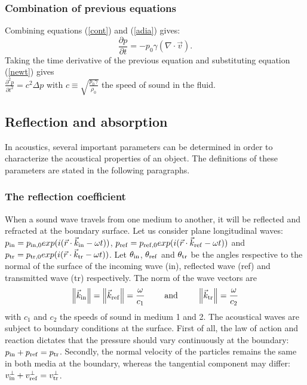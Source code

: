 \subsubsection*{Combination of previous equations}
Combining equations (\ref{cont}) and (\ref{adia}) gives:
\begin{equation}
\frac{\partial p}{\partial t} = - p_0 \gamma \left(\nabla \cdot \vec{v}\right).
\label{dpdt}
\end{equation}
Taking the time derivative of the previous equation and substituting equation (\ref{newt}) gives\\
$\frac{\partial^2 p}{\partial t^2} =  c^2 \Delta p$ with $c\equiv \sqrt{\frac{p_0 \gamma}{\rho_0}}$ the speed of sound in the fluid.







\subsection{Reflection and absorption}
In acoustics, several important parameters can be determined in order to characterize the acoustical properties of an object. The  definitions of these parameters are stated in the following paragraphs.


\subsubsection*{The reflection coefficient}
When a sound wave travels from one medium to another, it will be reflected and refracted at the boundary surface. Let us consider plane longitudinal waves:
$p_\mathrm{in} = p_\mathrm{in, 0} exp(i (\vec{r} \cdot \vec{k}_\mathrm{in} -  \omega t))$, $p_\mathrm{ref} = p_\mathrm{ref, 0} exp(i (\vec{r} \cdot \vec{k}_\mathrm{ref} -  \omega t))$ and $p_\mathrm{tr} = p_\mathrm{tr, 0} exp(i (\vec{r} \cdot \vec{k}_\mathrm{tr} -  \omega t))$. Let $\theta_\mathrm{in}$, $\theta_\mathrm{ref}$ and $\theta_\mathrm{tr}$ be the angles respective to the normal of the surface of the incoming wave (in), reflected  wave (ref) and transmitted  wave (tr) respectively. The norm of the wave vectors are 
\[
\left\|\vec{k}_\mathrm{in}\right\|
= \left\|\vec{k}_\mathrm{ref}\right\|
= \frac{\omega}{c_1}
\qquad\textrm{ and } \qquad
\left\|\vec{k}_\mathrm{tr}\right\|
= \frac{\omega}{c_2}
\]
with $c_1$ and $c_2$ the speeds of sound in medium 1 and 2. The acoustical waves are subject to boundary conditions at the surface. First of all, the law of action and reaction dictates that the pressure should vary continuously at the boundary: $p_\mathrm{in} + p_\mathrm{ref} = p_\mathrm{tr}$.
Secondly, the normal velocity of the particles remains the same in both media at the boundary, whereas the tangential component may differ: $v_\mathrm{in}^\perp + v_\mathrm{ref}^\perp = v_\mathrm{tr}^\perp$.

